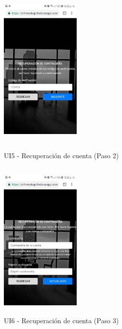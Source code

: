 \begin{figure}[h!]
	\begin{minipage}{0.48\textwidth}
		\centering
		\includegraphics[width=4cm,height=8cm]{imagenes/Anexos/Mockup/rec02.jpg}
		\caption{UI5 - Recuperación de cuenta (Paso 2)}
		\label{fig:rec02}
	\end{minipage}\hfill
	\begin{minipage}{0.48\textwidth}
		\centering
		\includegraphics[width=4cm,height=8cm]{imagenes/Anexos/Mockup/rec03.jpg}
		\caption{UI6 - Recuperación de cuenta (Paso 3) }
		\label{fig:rec03}
	\end{minipage}\hfill
\end{figure}

